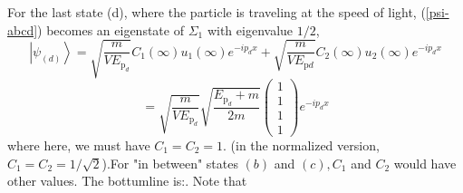 For the last state (d), where the particle is traveling at the speed of light, (\ref{psi-abcd}) becomes an eigenstate of $\Sigma_1$ with eigenvalue $1/2$,
$$
\left|\psi_{(d)}\right\rangle=\sqrt{\frac{m}{V E_{\mathrm{p}_{d}}}} C_{1}(\infty) u_{1}(\infty) e^{-i p_{d} x}+\sqrt{\frac{m}{V E_{\mathrm{p} d}}} C_{2}(\infty) u_{2}(\infty) e^{-i p_{d} x}
$$
$$
=\sqrt{\frac{m}{V E_{\mathrm{p}_{d}}}} \sqrt{\frac{E_{\mathrm{p}_{d}}+m}{2 m}}\left(\begin{array}{l}
{1} \\
{1} \\
{1} \\
{1}
\end{array}\right) e^{-i p_{d} x}
$$
where here, we must have $C_1=C_2=1$. (in the normalized version, $C_1=C_2=1/\sqrt{2}$).For "in between" states $(b)$ and $(c), C_{1}$ and $C_{2}$ would have other values. The bottumline is:. Note that 

